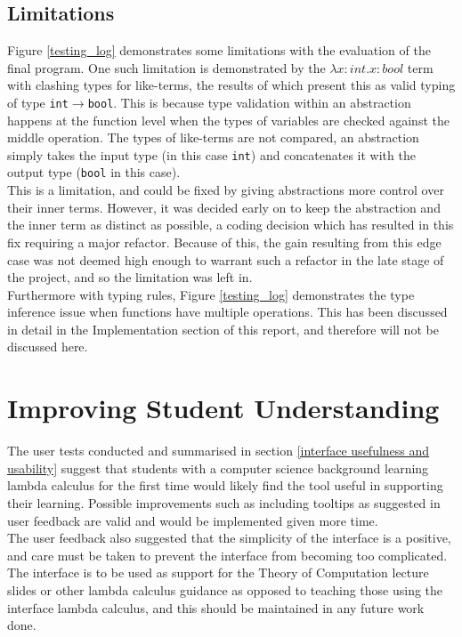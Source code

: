 \documentclass[a4paper,11pt]{report}
\begin{document}
\subsection{Limitations}
Figure \ref{testing_log} demonstrates some limitations with the evaluation of the final program. One such limitation is demonstrated by the $\lambda x:int.x:bool$ term with clashing types for like-terms, the results of which present this as valid typing of type \texttt{int$\rightarrow$bool}. This is because type validation within an abstraction happens at the function level when the types of variables are checked against the middle operation. The types of like-terms are not compared, an abstraction simply takes the input type (in this case \texttt{int}) and concatenates it with the output type (\texttt{bool} in this case).\\

This is a limitation, and could be fixed by giving abstractions more control over their inner terms. However, it was decided early on to keep the abstraction and the inner term as distinct as possible, a coding decision which has resulted in this fix requiring a major refactor. Because of this, the gain resulting from this edge case was not deemed high enough to warrant such a refactor in the late stage of the project, and so the limitation was left in.\\

Furthermore with typing rules, Figure \ref{testing_log} demonstrates the type inference issue when functions have multiple operations. This has been discussed in detail in the Implementation section of this report, and therefore will not be discussed here.\\

\section{Improving Student Understanding}
The user tests conducted and summarised in section \ref{interface usefulness and usability} suggest that students with a computer science background learning lambda calculus for the first time would likely find the tool useful in supporting their learning. Possible improvements such as including tooltips as suggested in user feedback are valid and would be implemented given more time.\\

The user feedback also suggested that the simplicity of the interface is a positive, and care must be taken to prevent the interface from becoming too complicated. The interface is to be used as support for the Theory of Computation lecture slides or other lambda calculus guidance as opposed to teaching those using the interface lambda calculus, and this should be maintained in any future work done.\\
\end{document}
